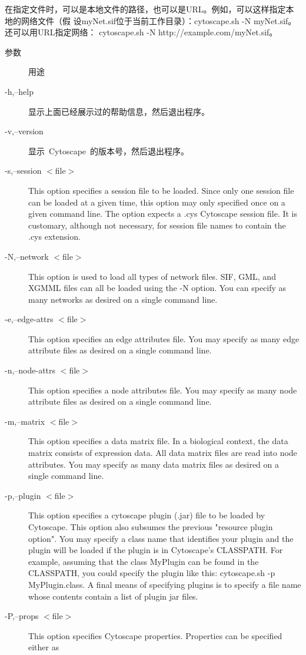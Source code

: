 在指定文件时，可以是本地文件的路径，也可以是URL。例如，可以这样指定本地的网络文件（假
设myNet.sif位于当前工作目录）：cytoscape.sh -N myNet.sif。还可以用URL指定网络：
cytoscape.sh -N http://example.com/myNet.sif。
\begin{description}
\item[参数] 用途
\item[-h,--help] 显示上面已经展示过的帮助信息，然后退出程序。
\item[-v,--version] 显示~Cytoscape~的版本号，然后退出程序。
\item[-s,--session $<$file$>$] This option specifies a session file to be loaded. 
Since only one session file can be loaded at a given time, this option may only specified once on a given
command line. The option expects a .cys Cytoscape session file. It is customary,
although not necessary, for session file names to contain the .cys extension.
\item[-N,--network $<$file$>$]This option is used to load all types of network files. SIF, GML, and XGMML files
can all be loaded using the -N option. You can specify as many networks as
desired on a single command line.
\item[-e,--edge-attrs $<$file$>$] This option specifies an edge attributes file. You may specify as many edge
attribute files as desired on a single command line.
\item[-n,--node-attrs $<$file$>$] This option specifies a node attributes file. You may specify as many node
attribute files as desired on a single command line.
\item[-m,--matrix $<$file$>$]This option specifies a data matrix file. In a biological context, the data
matrix consists of expression data. All data matrix files are read into node
attributes. You may specify as many data matrix files as desired on a single
command line.
\item[-p,--plugin $<$file$>$]This option specifies a cytoscape plugin (.jar) file to be loaded by Cytoscape.
This option also subsumes the previous "resource plugin option". You may specify
a class name that identifies your plugin and the plugin will be loaded if the
plugin is in Cytoscape's CLASSPATH. For example, assuming that the class MyPlugin
can be found in the CLASSPATH, you could specify the plugin like this:
cytoscape.sh -p MyPlugin.class. A final means of specifying plugins is to specify
a file name whose contents contain a list of plugin jar files.
\item[-P,--props $<$file$>$]This option specifies Cytoscape properties. Properties can be specified either as

\end{description}
